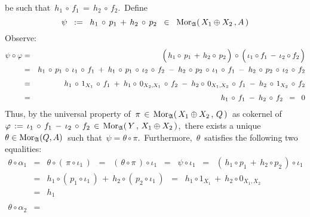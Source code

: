 \begin{enumerate}
	be such that
	\,$h_{1}\,\circ\,f_{1} \,=\, h_{2}\,\circ\,f_{2}$.\,
	Define
	{\color{red}
	\begin{equation*}
	\psi
	\;\; := \;\;
		h_{1}\,\circ\,p_{1}\,+\,h_{2}\,\circ \,p_{2}
	\;\; \in \;\;
		\textnormal{Mor}_{\mathfrak{A}}(\,X_{1}\oplus X_{2}\,,A\,)
	\end{equation*}
	}
	Observe:
	\begin{eqnarray*}
	\psi \circ \varphi
	& = &
		\left(\,h_{1} \circ\, p_{1} \,\overset{{\color{white}.}}{+}\, h_{2} \circ\, p_{2}\,\right)
		\,\circ\,
		\left(\,\iota_{1} \circ f_{1} \,\overset{{\color{white}.}}{-}\, \iota_{2} \circ f_{2}\,\right)
	\\
	& = &
		h_{1} \,\circ\, p_{1} \,\circ\, \iota_{1} \,\circ\, f_{1}
		\; + \;
		h_{1} \,\circ\, p_{1} \,\circ\, \iota_{2} \,\circ\, f_{2}
		\; - \;
		h_{2} \,\circ\, p_{2} \,\circ\, \iota_{1} \,\circ\, f_{1}
		\; - \;
		h_{2} \,\circ\, p_{2} \,\circ\, \iota_{2} \,\circ\, f_{2}
	\\
	& \overset{{\color{white}1}}{=} &
		h_{1} \,\circ\, 1_{X_{1}} \,\circ\, f_{1}
		\; + \;
		h_{1} \circ\, 0_{X_{2},X_{1}} \,\circ\, f_{2}
		\; - \;
		h_{2} \circ\, 0_{X_{1},X_{2}} \,\circ\, f_{1}
		\; - \;
		h_{2} \,\circ\, 1_{X_{2}} \,\circ\, f_{2}
	\\
	& \overset{{\color{white}1}}{=} &
		h_{1} \,\circ\, f_{1}
		\; - \;
		h_{2} \,\circ\, f_{2}
	\;\; = \;\;
		0
	\end{eqnarray*}
	Thus, by the universal property of
	\,$\pi \,\in\, \textnormal{Mor}_{\mathfrak{A}}(\,X_{1} \oplus X_{2}\,,\,Q\,)$\,
	as cokernel of
	\,$\varphi\,:=\,\iota_{1}\,\circ\,f_{1}\,-\,\iota_{2}\,\circ\,f_{2}\,\in\,\textnormal{Mor}_{\mathfrak{A}}(\,Y\,,\,X_{1} \oplus X_{2}\,)$,\,
	there exists a unique
	\,$\theta \in \textnormal{Mor}_{\mathfrak{A}}(Q,A)$\,
	such that
	\,$\psi = \theta \circ \pi$.\,
	Furthermore, \,$\theta$\, satisfies the following two equalities:
	\begin{eqnarray*}
	\theta \circ \alpha_{1}
	& = &
		\theta \circ (\,\pi \circ \iota_{1}\,)
	\;\; = \;\;
		(\,\theta \circ \pi\,) \circ \iota_{1}
	\;\; = \;\;
		\psi \circ \iota_{1} 
	\;\; = \;\;
		(\,h_{1} \circ p_{1} \,+\, h_{2} \circ p_{2} \,) \circ \iota_{1}
	\\
	& = &
		h_{1} \circ (\,p_{1} \circ \iota_{1}\,)
		\,+\
		h_{2} \circ (\,p_{2} \circ \iota_{1}\,)
	\;\; = \;\;
		h_{1} \circ 1_{X_{1}}
		\,+\
		h_{2} \circ 0_{X_{1},X_{2}}
	\\
	& = &
		h_{1}
	\\ \\
	\theta \circ \alpha_{2}
	& = &

\end{eqnarray*}
\end{enumerate}
